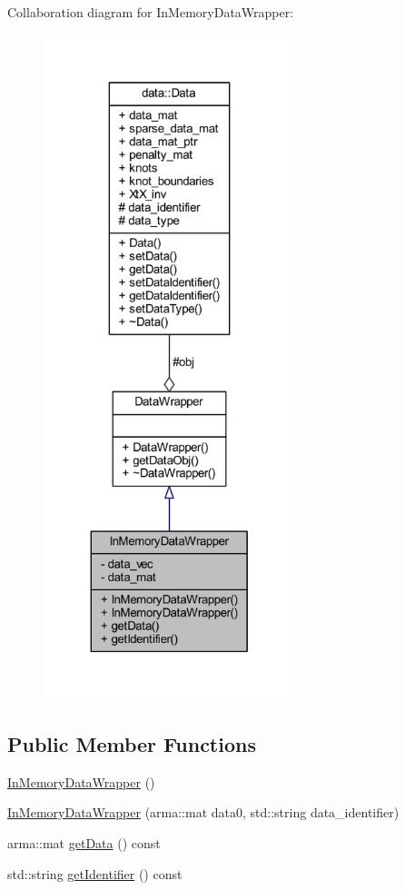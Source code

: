 Collaboration diagram for In\+Memory\+Data\+Wrapper\+:
\nopagebreak
\begin{figure}[H]
\begin{center}
\leavevmode
\includegraphics[height=550pt]{class_in_memory_data_wrapper__coll__graph}
\end{center}
\end{figure}
\subsection*{Public Member Functions}
\begin{DoxyCompactItemize}
\item 
\mbox{\hyperlink{class_in_memory_data_wrapper_a091dd35c773aed960bc9ea9e95f7ae5b}{In\+Memory\+Data\+Wrapper}} ()
\item 
\mbox{\hyperlink{class_in_memory_data_wrapper_a0b3a3299fa46c88dc807e858c2f67a1f}{In\+Memory\+Data\+Wrapper}} (arma\+::mat data0, std\+::string data\+\_\+identifier)
\item 
arma\+::mat \mbox{\hyperlink{class_in_memory_data_wrapper_a69c754048807d42d8178914e8339a808}{get\+Data}} () const
\item 
std\+::string \mbox{\hyperlink{class_in_memory_data_wrapper_a2a81d397debd1c568f638004090cbdef}{get\+Identifier}} () const
\end{DoxyCompactItemize}

